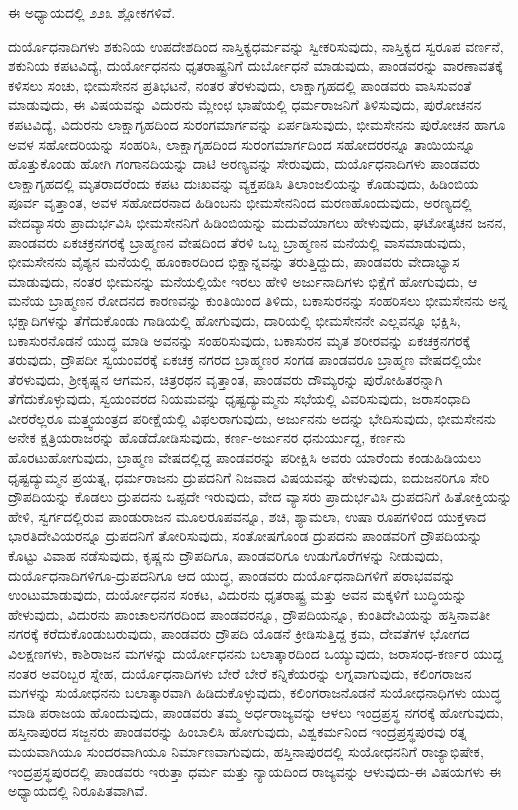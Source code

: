 ಈ ಅಧ್ಯಾಯದಲ್ಲಿ ೨೨೩ ಶ್ಲೋಕಗಳಿವೆ.

ದುರ್ಯೊಧನಾದಿಗಳು ಶಕುನಿಯ ಉಪದೇಶದಿಂದ ನಾಸ್ತಿಕ್ಯಧರ್ಮವನ್ನು ಸ್ವೀಕರಿಸುವುದು, ನಾಸ್ತಿಕ್ಯದ ಸ್ವರೂಪ ವರ್ಣನೆ, ಶಕುನಿಯ ಕಪಟವಿದ್ಯೆ, ದುರ್ಯೋಧನನು ಧೃತರಾಷ್ಟ್ರನಿಗೆ ದುರ್ಬೋಧನೆ ಮಾಡುವುದು, ಪಾಂಡವರನ್ನು ವಾರಣಾವತಕ್ಕೆ ಕಳಿಸಲು ಸಂಚು, ಭೀಮಸೇನನ ಪ್ರತಿಭಟನೆ, ನಂತರ ತೆರಳುವುದು, ಲಾಕ್ಷಾಗೃಹದಲ್ಲಿ ಪಾಂಡವರು ವಾಸಿಸುವಂತೆ ಮಾಡುವುದು, ಈ ವಿಷಯವನ್ನು ವಿದುರನು ಮ್ಲೇಂಛ ಭಾಷೆಯಲ್ಲಿ ಧರ್ಮರಾಜನಿಗೆ ತಿಳಿಸುವುದು, ಪುರೋಚನನ ಕಪಟವಿದ್ಯೆ, ವಿದುರನು ಲಾಕ್ಷಾಗೃಹದಿಂದ ಸುರಂಗಮಾರ್ಗವನ್ನು ಏರ್ಪಡಿಸುವುದು, ಭೀಮಸೇನನು ಪುರೋಚನ ಹಾಗೂ ಅವಳ ಸಹೋದರಿ\-ಯನ್ನು ಸಂಹರಿಸಿ, ಲಾಕ್ಷಾಗೃಹದಿಂದ ಸುರಂಗಮಾರ್ಗದಿಂದ ಸಹೋದರರನ್ನೂ ತಾಯಿಯನ್ನೂ ಹೊತ್ತುಕೊಂಡು ಹೋಗಿ ಗಂಗಾನದಿಯನ್ನು ದಾಟಿ ಅರಣ್ಯವನ್ನು ಸೇರುವುದು, ದುರ್ಯೊಧನಾದಿಗಳು ಪಾಂಡವರು ಲಾಕ್ಷಾಗೃಹದಲ್ಲಿ ಮೃತರಾದರೆಂದು ಕಪಟ ದುಃಖವನ್ನು ವ್ಯಕ್ತಪಡಿಸಿ ತಿಲಾಂಜಲಿಯನ್ನು ಕೊಡುವುದು, ಹಿಡಿಂಬಿಯ ಪೂರ್ವ ವೃತ್ತಾಂತ, ಅವಳ ಸಹೋದರನಾದ ಹಿಡಿಂಬನು ಭೀಮಸೇನನಿಂದ ಮರಣಹೊಂದುವುದು, ಅರಣ್ಯದಲ್ಲಿ ವೇದವ್ಯಾಸರು ಪ್ರಾದುರ್ಭವಿಸಿ ಭೀಮಸೇನನಿಗೆ ಹಿಡಿಂಬಿಯನ್ನು ಮದುವೆಯಾಗಲು ಹೇಳುವುದು, ಘಟೋತ್ಕಚನ ಜನನ, ಪಾಂಡವರು ಏಕಚಕ್ರನಗರಕ್ಕೆ ಬ್ರಾಹ್ಮಣನ ವೇಷದಿಂದ ತೆರಳಿ ಒಬ್ಬ ಬ್ರಾಹ್ಮಣನ ಮನೆಯಲ್ಲಿ ವಾಸಮಾಡುವುದು, ಭೀಮಸೇನನು ವೈಶ್ಯನ ಮನೆಯಲ್ಲಿ ಹೂಂಕಾರದಿಂದ ಭಿಕ್ಷಾನ್ನವನ್ನು ತರುತ್ತಿದ್ದುದು, ಪಾಂಡವರು ವೇದಾಭ್ಯಾಸ ಮಾಡುವುದು, ನಂತರ ಭೀಮನನ್ನು ಮನೆಯಲ್ಲಿಯೇ ಇರಲು ಹೇಳಿ ಅರ್ಜುನಾದಿಗಳು ಭಿಕ್ಷೆಗೆ ಹೋಗುವುದು, ಆ ಮನೆಯ ಬ್ರಾಹ್ಮಣನ ರೋದನದ ಕಾರಣವನ್ನು ಕುಂತಿಯಿಂದ ತಿಳಿದು, ಬಕಾಸುರನನ್ನು ಸಂಹರಿಸಲು ಭೀಮಸೇನನು ಅನ್ನ ಭಕ್ಷಾದಿಗಳನ್ನು ತೆಗೆದುಕೊಂಡು ಗಾಡಿಯಲ್ಲಿ ಹೋಗುವುದು, ದಾರಿಯಲ್ಲಿ ಭೀಮಸೇನನೇ ಎಲ್ಲವನ್ನೂ ಭಕ್ಷಿಸಿ, ಬಕಾಸುರನೊಡನೆ ಯುದ್ಧ ಮಾಡಿ ಅವನನ್ನು ಸಂಹರಿಸುವುದು, ಬಕಾಸುರನ ಮೃತ ಶರೀರವನ್ನು ಏಕಚಕ್ರನಗರಕ್ಕೆ ತರುವುದು, ದ್ರೌಪದೀ ಸ್ವಯಂವರಕ್ಕೆ ಏಕಚಕ್ರ ನಗರದ ಬ್ರಾಹ್ಮಣರ ಸಂಗಡ ಪಾಂಡವರೂ ಬ್ರಾಹ್ಮಣ ವೇಷದಲ್ಲಿಯೇ ತೆರಳುವುದು, ಶ‍್ರೀಕೃಷ್ಣನ ಆಗಮನ, ಚಿತ್ರರಥನ ವೃತ್ತಾಂತ, ಪಾಂಡವರು ದೌಮ್ಯರನ್ನು ಪುರೋಹಿತರನ್ನಾಗಿ ತೆಗೆದುಕೊಳ್ಳುವುದು, ಸ್ವಯಂವರದ ನಿಯಮವನ್ನು ಧೃಷ್ಟದ್ಯುಮ್ಮನು ಸಭೆಯಲ್ಲಿ ವಿವರಿಸುವುದು, ಜರಾಸಂಧಾದಿ ವೀರರೆಲ್ಲರೂ ಮತ್ತ್ವಯಂತ್ರದ ಪರೀಕ್ಷೆಯಲ್ಲಿ ವಿಫಲರಾಗುವುದು, ಅರ್ಜುನನು ಅದನ್ನು ಭೇದಿಸುವುದು, ಭೀಮಸೇನನು ಅನೇಕ ಕ್ಷತ್ರಿಯರಾಜರನ್ನು ಹೊಡೆದೋಡಿಸುವುದು, ಕರ್ಣ-ಅರ್ಜುನರ ಧನುರ್ಯುದ್ದ, ಕರ್ಣನು ಹೊರಟುಹೋಗುವುದು, ಬ್ರಾಹ್ಮಣ ವೇಷದಲ್ಲಿದ್ದ ಪಾಂಡವರನ್ನು ಪರೀಕ್ಷಿಸಿ ಅವರು ಯಾರೆಂದು ಕಂಡುಹಿಡಿಯಲು ಧೃಷ್ಟದ್ಯುಮ್ಮನ ಪ್ರಯತ್ನ, ಧರ್ಮರಾಜನು ದ್ರುಪದನಿಗೆ ನಿಜವಾದ ವಿಷಯವನ್ನು ಹೇಳುವುದು, ಐದುಜನರಿಗೂ ಸೇರಿ ದ್ರೌಪದಿಯನ್ನು ಕೊಡಲು ದ್ರುಪದನು ಒಪ್ಪದೇ ಇರುವುದು, ವೇದ ವ್ಯಾಸರು ಪ್ರಾದುರ್ಭವಿಸಿ ದ್ರುಪದನಿಗೆ ಹಿತೋಕ್ತಿಯನ್ನು ಹೇಳಿ, ಸ್ವರ್ಗದಲ್ಲಿರುವ ಪಾಂಡುರಾಜನ ಮೂಲರೂಪವನ್ನೂ, ಶಚಿ, ಶ್ಯಾಮಲಾ, ಉಷಾ ರೂಪಗಳಿಂದ ಯುಕ್ತಳಾದ ಭಾರತಿದೇವಿಯರನ್ನೂ ದ್ರುಪದನಿಗೆ ತೋರಿಸುವುದು, ಸಂತೋಷಗೊಂಡ ದ್ರುಪದನು ಪಾಂಡವರಿಗೆ ದ್ರೌಪದಿಯನ್ನು ಕೊಟ್ಟು ವಿವಾಹ ನಡೆಸುವುದು, ಕೃಷ್ಣನು ದ್ರೌಪದಿಗೂ, ಪಾಂಡವರಿಗೂ ಉಡುಗೊರೆಗಳನ್ನು ನೀಡುವುದು, ದುರ್ಯೊಧನಾದಿಗಳಿಗೂ-ದ್ರುಪದನಿಗೂ ಆದ ಯುದ್ಧ, ಪಾಂಡವರು ದುರ್ಯೊಧನಾದಿಗಳಿಗೆ ಪರಾಭವವನ್ನು ಉಂಟುಮಾಡುವುದು, ದುರ್ಯೋಧನನ ಸಂಕಟ, ವಿದುರನು ಧೃತರಾಷ್ಟ್ರ ಮತ್ತು ಅವನ ಮಕ್ಕಳಿಗೆ ಬುದ್ಧಿಯನ್ನು ಹೇಳುವುದು, ವಿದುರನು ಪಾಂಚಾಲನಗರದಿಂದ ಪಾಂಡವರನ್ನೂ, ದ್ರೌಪದಿಯನ್ನೂ, ಕುಂತಿದೇವಿಯನ್ನು ಹಸ್ತಿನಾವತೀ ನಗರಕ್ಕೆ ಕರೆದುಕೊಂಡುಬರುವುದು, ಪಾಂಡವರು ದ್ರೌಪದಿ ಯೊಡನೆ ಕ್ರೀಡಿಸುತ್ತಿದ್ದ ಕ್ರಮ, ದೇವತೆಗಳ ಭೋಗದ ವಿಲಕ್ಷಣಗಳು, ಕಾಶಿರಾಜನ ಮಗಳನ್ನು ದುರ್ಯೋಧನನು ಬಲಾತ್ಕಾರದಿಂದ ಒಯ್ಯುವುದು, ಜರಾ\-ಸಂಧ-ಕರ್ಣರ ಯುದ್ದ ನಂತರ ಅವರಿಬ್ಬರ ಸ್ನೇಹ, ದುರ್ಯೊಧನಾದಿಗಳು ಬೇರೆ ಬೇರೆ ಕನ್ನಿಕೆಯರನ್ನು ಲಗ್ನವಾಗುವುದು, ಕಲಿಂಗರಾಜನ ಮಗಳನ್ನು ಸುಯೋಧನನು ಬಲಾತ್ಕಾರವಾಗಿ ಹಿಡಿದುಕೊಳ್ಳುವುದು, ಕಲಿಂಗರಾಜನೊಡನೆ ಸುಯೋಧನಾಧಿಗಳು ಯುದ್ಧ ಮಾಡಿ ಪರಾಜಯ ಹೊಂದುವುದು, ಪಾಂಡವರು ತಮ್ಮ ಅರ್ಧರಾಜ್ಯವನ್ನು ಆಳಲು ಇಂದ್ರಪ್ರಸ್ಥ ನಗರಕ್ಕೆ ಹೋಗುವುದು, ಹಸ್ತಿನಾಪುರದ ಸಜ್ಜನರು ಪಾಂಡವರನ್ನು ಹಿಂಬಾಲಿಸಿ ಹೋಗುವುದು, ವಿಶ್ವಕರ್ಮನಿಂದ ಇಂದ್ರಪ್ರಸ್ಥಪುರವು ರತ್ನ ಮಯವಾಗಿಯೂ ಸುಂದರವಾಗಿಯೂ ನಿರ್ಮಾಣವಾಗುವುದು, ಹಸ್ತಿನಾಪುರದಲ್ಲಿ ಸುಯೋಧನನಿಗೆ ರಾಜ್ಯಾಭಿಷೇಕ, ಇಂದ್ರಪ್ರಸ್ಥಪುರದಲ್ಲಿ ಪಾಂಡವರು ಇರುತ್ತಾ ಧರ್ಮ ಮತ್ತು ನ್ಯಾಯದಿಂದ ರಾಜ್ಯವನ್ನು ಆಳುವುದು-ಈ ವಿಷಯಗಳು ಈ ಅಧ್ಯಾಯದಲ್ಲಿ ನಿರೂಪಿತವಾಗಿವೆ.


